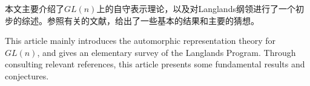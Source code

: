 
\begin{cabstract}
  本文主要介绍了$GL(n)$上的自守表示理论，以及对Langlands纲领进行了一个初步的综述。参照有关的文献，给出了一些基本的结果和主要的猜想。
\end{cabstract}


\begin{eabstract}
   This article mainly introduces the automorphic representation theory for $GL(n)$, and gives an elementary survey of the Langlands Program. Through consulting relevant references, this article presents some fundamental results and conjectures.
\end{eabstract}

